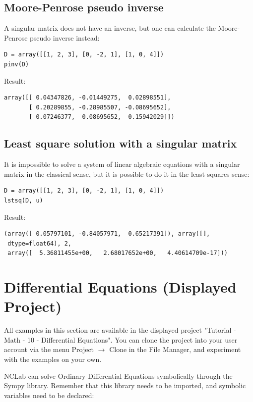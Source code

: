 \documentclass[article,A4,12pt]{llncs}
\begin{document}
\subsection{Moore-Penrose pseudo inverse}

A singular matrix does not have an inverse, but one can calculate the Moore-Penrose
pseudo inverse instead:
\begin{verbatim}
D = array([[1, 2, 3], [0, -2, 1], [1, 0, 4]])
pinv(D)
\end{verbatim}
Result:
\begin{verbatim}
array([[ 0.04347826, -0.01449275,  0.02898551],
       [ 0.20289855, -0.28985507, -0.08695652],
       [ 0.07246377,  0.08695652,  0.15942029]])
\end{verbatim}

\subsection{Least square solution with a singular matrix}

It is impossible to solve a system of linear algebraic equations with a singular
matrix in the classical sense, but it is possible to do it in the least-squares
sense:
\begin{verbatim}
D = array([[1, 2, 3], [0, -2, 1], [1, 0, 4]])
lstsq(D, u)
\end{verbatim}
Result:
\begin{verbatim}
(array([ 0.05797101, -0.84057971,  0.65217391]), array([], 
 dtype=float64), 2, 
 array([  5.36811455e+00,   2.68017652e+00,   4.40614709e-17]))
\end{verbatim}



\section{Differential Equations (Displayed Project)}

All examples in this section are available in the displayed project 
"Tutorial - Math - 10 - Differential Equations". You can clone the project into 
your user account via the menu Project $\rightarrow$ Clone in the File 
Manager, and experiment with the examples on your own.

NCLab can solve Ordinary Differential Equations symbolically through the 
Sympy library. Remember that this library needs to be imported, and 
symbolic variables need to be declared:
\end{document}

